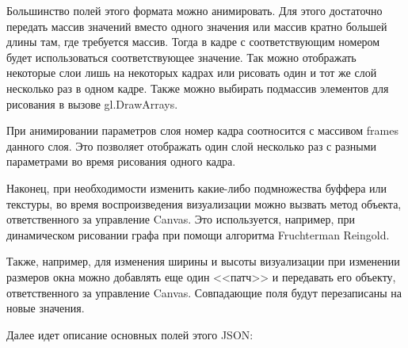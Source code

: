 Большинство полей этого формата можно анимировать. Для этого достаточно передать массив значений вместо одного значения или массив кратно большей длины там, где требуется массив. Тогда в кадре с соответствующим номером будет использоваться соответствующее значение. Так можно отображать некоторые слои лишь на некоторых кадрах или рисовать один и тот же слой несколько раз в одном кадре. Также можно выбирать подмассив элементов для рисования в вызове gl.DrawArrays.

При анимировании параметров слоя номер кадра соотносится с массивом frames данного слоя. Это позволяет отображать один слой несколько раз с разными параметрами во время рисования одного кадра.

Наконец, при необходимости изменить какие-либо подмножества буффера или текстуры, во время воспроизведения визуализации можно вызвать метод объекта, ответственного за управление Canvas. Это используется, например, при динамическом рисовании графа при помощи алгоритма Fruchterman Reingold.

Также, например, для изменения ширины и высоты визуализации при изменении размеров окна можно добавлять еще один <<патч>> и передавать его объекту, ответственного за управление Canvas. Совпадающие поля будут перезаписаны на новые значения.

Далее идет описание основных полей этого JSON:

